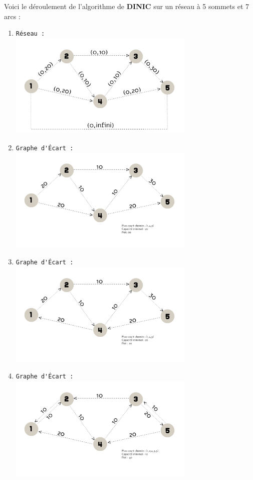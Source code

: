 \documentclass[11pt, a4paper]{report}
\begin{document}
	Voici le déroulement de l'algorithme de \textbf{DINIC} sur un réseau à 5 sommets et 7 arcs :
	\begin{enumerate}
		\item \verb|Réseau :|\\
	\includegraphics[width=0.7\textwidth]{images/R1.png}\\
	\pagebreak
		\item \verb|Graphe d'Écart :|\\
	\includegraphics[width=0.7\textwidth]{images/GE1.png}\\
		\item \verb|Graphe d'Écart :|\\
	\includegraphics[width=0.7\textwidth]{images/GE2.png}\\
		\item \verb|Graphe d'Écart :|\\
	\includegraphics[width=0.7\textwidth]{images/GE3.png}\\

\end{enumerate}
\end{document}
